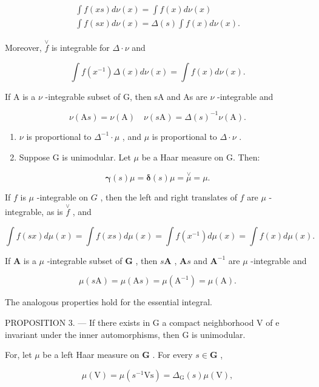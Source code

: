 \[
\begin{array}{l} \int f (x s) d \nu (x) = \int f (x) d \nu (x) \\ \int f (s x) d \nu (x) = \Delta (s) \int f (x) d \nu (x). \end{array}\tag{25}
\]

Moreover, \(\stackrel{\vee}{f}\) is integrable for \(\Delta \cdot \nu\) and

\[
\int f (x ^ {- 1}) \Delta (x) d \nu (x) = \int f (x) d \nu (x).\tag{26}
\]

If A is a \(\nu\) -integrable subset of G, then sA and As are \(\nu\) -integrable and

\[
\nu (\mathrm{A} s) = \nu (\mathrm{A}) \quad \nu (s \mathrm{A}) = \Delta (s) ^ {- 1} \nu (\mathrm{A}).\tag{27}
\]

\begin{enumerate}
\def\labelenumi{\arabic{enumi})}
\setcounter{enumi}{2}
\item
  \(\nu\) is proportional to \(\Delta^{-1} \cdot \mu\) , and \(\mu\) is proportional to \(\Delta \cdot \nu\) .
\item
  Suppose G is unimodular. Let \(\mu\) be a Haar measure on G. Then:
\end{enumerate}

\[
\boldsymbol {\gamma} (s) \mu = \boldsymbol {\delta} (s) \mu = \stackrel {\vee} {\mu} = \mu .\tag{28}
\]

If \(f\) is \(\mu\) -integrable on \(G\) , then the left and right translates of \(f\) are \(\mu\) -integrable, as is \(\overset{\vee}{f}\) , and

\[
\int f (s x) d \mu (x) = \int f (x s) d \mu (x) = \int f (x ^ {- 1}) d \mu (x) = \int f (x) d \mu (x).\tag{29}
\]

If \(\mathbf{A}\) is a \(\mu\) -integrable subset of \(\mathbf{G}\) , then \(s\mathbf{A}\) , \(\mathbf{A}s\) and \(\mathbf{A}^{-1}\) are \(\mu\) -integrable and

\[
\mu (s \mathrm{A}) = \mu (\mathrm{A} s) = \mu (\mathrm{A} ^ {- 1}) = \mu (\mathrm{A}).\tag{30}
\]

The analogous properties hold for the essential integral.

PROPOSITION 3. --- If there exists in G a compact neighborhood V of e invariant under the inner automorphisms, then G is unimodular.

For, let \(\mu\) be a left Haar measure on \(\mathbf{G}\) . For every \(s \in \mathbf{G}\) ,

\[
\mu (\mathrm{V}) = \mu (s ^ {- 1} \mathrm{Vs}) = \Delta_ {\mathrm{G}} (s) \mu (\mathrm{V}),
\]

